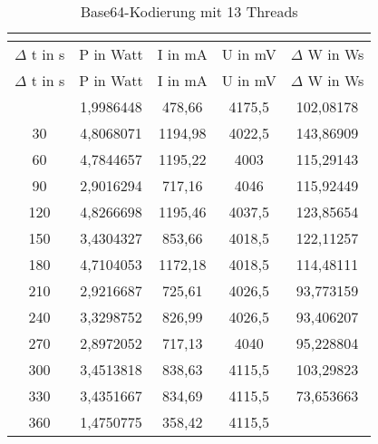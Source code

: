 \begin{longtable}[c]{ccccc}
\caption{Base64-Kodierung mit 13 Threads} \\
\label{tab:Base64MessungThreadDreizehn}\\
\hline
{$\Delta$ t in s} & {P in Watt} & {I in mA} & {U in mV} & {$\Delta$ W in Ws} \\
\hline
\endfirsthead
\hline
$\Delta$ t in s & P in Watt & I in mA & U in mV & $\Delta$ W in Ws \\
\hline
\endhead
\hline
\endfoot
\hline
 \midrule
    0     & 1,9986448 & 478,66 & 4175,5 & 102,08178 \\
    \midrule
    30    & 4,8068071 & 1194,98 & 4022,5 & 143,86909 \\
    \midrule
    60    & 4,7844657 & 1195,22 & 4003  & 115,29143 \\
    \midrule
    90    & 2,9016294 & 717,16 & 4046  & 115,92449 \\
    \midrule
    120   & 4,8266698 & 1195,46 & 4037,5 & 123,85654 \\
    \midrule
    150   & 3,4304327 & 853,66 & 4018,5 & 122,11257 \\
    \midrule
    180   & 4,7104053 & 1172,18 & 4018,5 & 114,48111 \\
    \midrule
    210   & 2,9216687 & 725,61 & 4026,5 & 93,773159 \\
    \midrule
    240   & 3,3298752 & 826,99 & 4026,5 & 93,406207 \\
    \midrule
    270   & 2,8972052 & 717,13 & 4040  & 95,228804 \\
    \midrule
    300   & 3,4513818 & 838,63 & 4115,5 & 103,29823 \\
    \midrule
    330   & 3,4351667 & 834,69 & 4115,5 & 73,653663 \\
    \midrule
    360   & 1,4750775 & 358,42 & 4115,5 &  \\
\end{longtable}